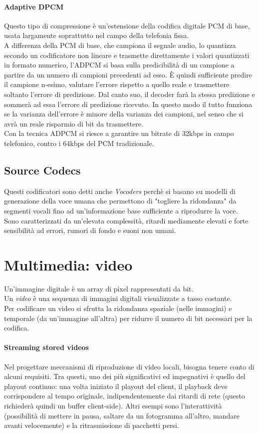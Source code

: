 \paragraph{Adaptive DPCM}
Questo tipo di compressione è un'estensione della codifica digitale PCM di base, usata largamente soprattutto nel campo della telefonia fissa.\\
A differenza della PCM di base, che campiona il segnale audio, lo quantizza secondo un codificatore non lineare e trasmette direttamente i valori quantizzati in formato numerico, l'ADPCM si basa sulla predicibilità di un campione a partire da un numero di campioni precedenti ad esso. È quindi sufficiente predire il campione n-esimo, valutare l'errore rispetto a quello reale e trasmettere soltanto l'errore di predizione. Dal canto suo, il decoder farà la stessa predizione e sommerà ad essa l'errore di predizione ricevuto. In questo modo il tutto funziona se la varianza dell'errore è minore della varianza dei campioni, nel senso che si avrà un reale risparmio di bit da trasmettere.\\
Con la tecnica ADPCM si riesce a garantire un bitrate di 32kbps in campo telefonico, contro i 64kbps del PCM tradizionale.

\subsection{Source Codecs}
Questi codificatori sono detti anche \textit{Vocoders} perchè si basano su modelli di generazione della voce umana che permettono di "togliere la ridondanza" da segmenti vocali fino ad un'informazione base sufficiente a riprodurre la voce.\\
Sono caratterizzati da un'elevata complessità, ritardi mediamente elevati e forte sensibilità ad errori, rumori di fondo e suoni non umani.

\section{Multimedia: video}
Un'immagine digitale è un array di pixel rappresentati da bit.\\
Un \textit{video} è una sequenza di immagini digitali visualizzate a tasso costante.\\
Per codificare un video si sfrutta la ridondanza spaziale (nelle immagini) e temporale (da un'immagine all'altra) per ridurre il numero di bit necessari per la codifica.

\paragraph{Streaming stored videos}
Nel progettare meccanismi di riproduzione di video locali, bisogna tenere conto di alcuni requisiti. Tra questi, uno dei più significativi ed impegnativi è quello del playout continuo: una volta iniziato il playout del client, il playback deve corrispondere al tempo originale, indipendentemente dai ritardi di rete (questo richiederà quindi un buffer client-side). Altri esempi sono l'interattività (possibilità di mettere in pausa, saltare da un fotogramma all'altro, mandare avanti velocemente) e la ritrasmissione di pacchetti persi.\\

